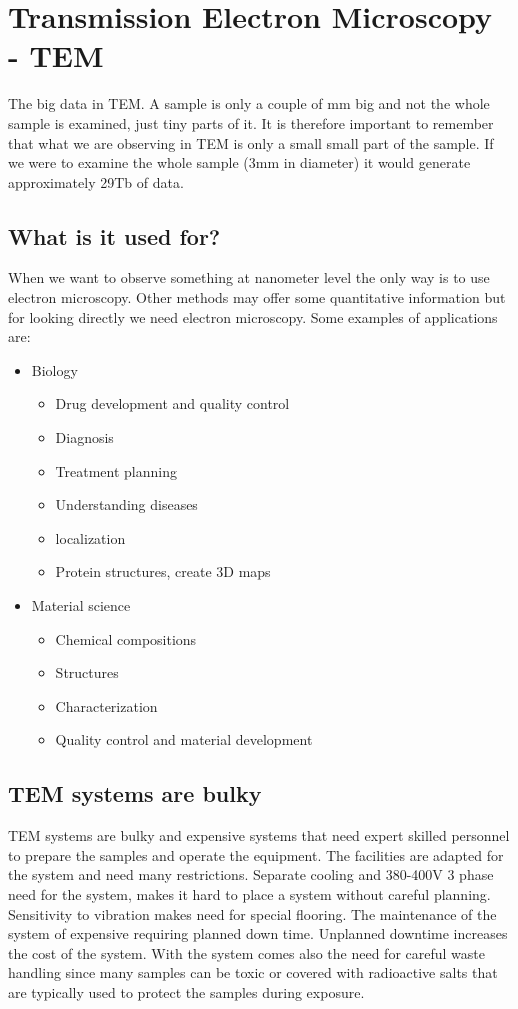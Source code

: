 \section{Transmission Electron Microscopy - TEM}
The big data in TEM. A sample is only a couple of mm big and not the whole sample is examined, just tiny parts of it. It is therefore important to remember that what we are observing in TEM is only a small small part of the sample. If we were to examine the whole sample (3mm in diameter) it would generate approximately 29Tb of data. 

	\subsection*{What is it used for?}
	When we want to observe something at nanometer level the only way is to use electron microscopy. Other methods may offer some quantitative information but for looking directly we need electron microscopy. Some examples of applications are:

	\begin{itemize}
		\item Biology \begin{itemize}
			\item Drug development and quality control
					\item Diagnosis
					\item Treatment planning
					\item Understanding diseases
					\item localization
					\item Protein structures, create 3D maps
		\end{itemize}
		\item Material science \begin{itemize}
					\item Chemical compositions
					\item Structures
					\item Characterization
					\item Quality control and material development
		\end{itemize}
	\end{itemize}

	\subsection*{TEM systems are bulky}
	TEM systems are bulky and expensive systems that need expert skilled personnel to prepare the samples and operate the equipment. The facilities are adapted for the system and need many restrictions. Separate cooling and 380-400V 3 phase need for the system, makes it hard to place a system without careful planning. Sensitivity to vibration makes need for special flooring. The maintenance  of the system of expensive requiring planned down time. Unplanned downtime increases the cost of the system. With the system comes also the need for careful waste handling since many samples can be toxic or covered with radioactive salts that are typically used to protect the samples during exposure. 


